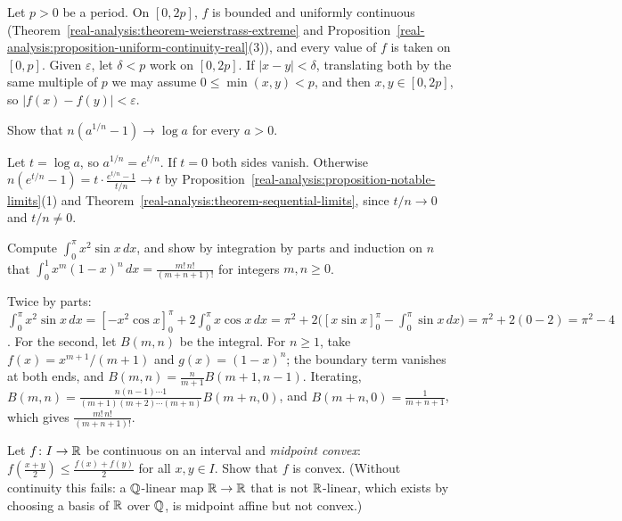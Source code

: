 \begin{solution}
Let $p > 0$ be a period. On $[0, 2p]$, $f$ is bounded and uniformly continuous (Theorem~\ref{real-analysis:theorem-weierstrass-extreme} and Proposition~\ref{real-analysis:proposition-uniform-continuity-real}(3)), and
every value of $f$ is taken on $[0, p]$. Given $\varepsilon$, let $\delta < p$ work on $[0, 2p]$. If $|x - y| < \delta$, translating both by the same multiple of $p$ we may assume $0 \leq \min(x, y) < p$, and then
$x, y \in [0, 2p]$, so $|f(x) - f(y)| < \varepsilon$.
\end{solution}

\begin{exercise}\label{real-analysis:exercise-log-limit}
Show that $n(a^{1/n} - 1) \to \log a$ for every $a > 0$.
\end{exercise}

\begin{solution}
Let $t = \log a$, so $a^{1/n} = e^{t/n}$. If $t = 0$ both sides vanish. Otherwise $n(e^{t/n} - 1) = t\cdot\frac{e^{t/n} - 1}{t/n} \to t$ by Proposition~\ref{real-analysis:proposition-notable-limits}(1) and
Theorem~\ref{real-analysis:theorem-sequential-limits}, since $t/n \to 0$ and $t/n \neq 0$.
\end{solution}

\begin{exercise}\label{real-analysis:exercise-integration-by-parts}
Compute $\int_0^\pi x^2\sin x\,dx$, and show by integration by parts and induction on $n$ that $\int_0^1x^m(1 - x)^n\,dx = \frac{m!\,n!}{(m + n + 1)!}$ for integers $m, n \geq 0$.
\end{exercise}

\begin{solution}
Twice by parts: $\int_0^\pi x^2\sin x\,dx = [-x^2\cos x]_0^\pi + 2\int_0^\pi x\cos x\,dx = \pi^2 + 2\bigl([x\sin x]_0^\pi - \int_0^\pi\sin x\,dx\bigr) = \pi^2 + 2(0 - 2) = \pi^2 - 4$. For the second, let
$B(m, n)$ be the integral. For $n \geq 1$, take $f(x) = x^{m+1}/(m + 1)$ and $g(x) = (1 - x)^n$; the boundary term vanishes at both ends, and $B(m, n) = \frac{n}{m+1}B(m + 1, n - 1)$. Iterating,
$B(m, n) = \frac{n(n-1) \cdots 1}{(m+1)(m+2) \cdots (m+n)}B(m + n, 0)$, and $B(m + n, 0) = \frac{1}{m + n + 1}$, which gives $\frac{m!\,n!}{(m + n + 1)!}$.
\end{solution}

\begin{exercise}\label{real-analysis:exercise-midpoint-convex}
Let $f \colon I \to \mathbb{R}$ be continuous on an interval and \emph{midpoint convex}: $f(\frac{x + y}2) \leq \frac{f(x) + f(y)}2$ for all $x, y \in I$. Show that $f$ is convex. (Without continuity this
fails: a $\mathbb{Q}$-linear map $\mathbb{R} \to \mathbb{R}$ that is not $\mathbb{R}$-linear, which exists by choosing a basis of $\mathbb{R}$ over $\mathbb{Q}$, is midpoint affine but not convex.)
\end{exercise}

